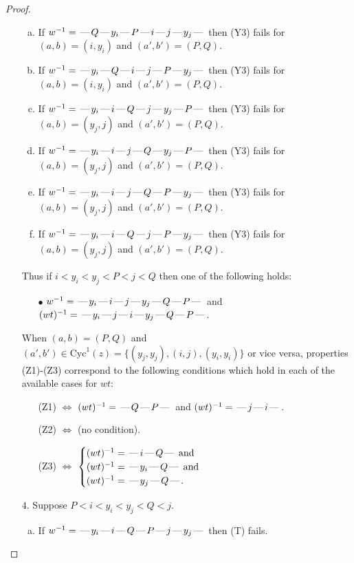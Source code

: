 \documentclass[10pt]{article}
\theoremstyle{definition}
\theoremstyle{definition}
\def\dash{\text{\hspace{0.5mm}---\hspace{0.5mm}}}
\def\Cyc{\mathrm{Cyc}}
\begin{document}
\begin{proof}
\begin{enumerate}
\begin{enumerate}[(a)]
\item If $w^{-1} = \dash Q\dash y_i\dash P\dash i\dash j\dash y_j\dash $ then (Y3) fails for $(a,b)=(i,y_i)$ and $(a',b')=(P,Q)$.
\item If $w^{-1} = \dash y_i\dash Q\dash i\dash j\dash P\dash y_j\dash $ then (Y3) fails for $(a,b)=(i,y_i)$ and $(a',b')=(P,Q)$.
\item If $w^{-1} = \dash y_i\dash i\dash Q\dash j\dash y_j\dash P\dash $ then (Y3) fails for $(a,b)=(y_j,j)$ and $(a',b')=(P,Q)$.
\item If $w^{-1} = \dash y_i\dash i\dash j\dash Q\dash y_j\dash P\dash $ then (Y3) fails for $(a,b)=(y_j,j)$ and $(a',b')=(P,Q)$.
\item If $w^{-1} = \dash y_i\dash i\dash j\dash Q\dash P\dash y_j\dash $ then (Y3) fails for $(a,b)=(y_j,j)$ and $(a',b')=(P,Q)$.
\item If $w^{-1} = \dash y_i\dash i\dash Q\dash j\dash P\dash y_j\dash $ then (Y3) fails for $(a,b)=(y_j,j)$ and $(a',b')=(P,Q)$.
\end{enumerate}
Thus if $i < y_i < y_j < P < j < Q$ then one of the following holds:
\begin{enumerate}
\item[$\bullet$] $w^{-1} = \dash y_i\dash i\dash j\dash y_j\dash Q\dash P\dash $ and $(wt)^{-1} = \dash y_i\dash j\dash i\dash y_j\dash Q\dash P\dash $.
\end{enumerate}
When $(a,b)= (P,Q)$ and $(a',b')\in \Cyc^1(z)=\{(y_j,y_j),(i,j),(y_i,y_i)\}$ or vice versa,
properties (Z1)-(Z3) correspond to the following conditions which
hold in each of the available cases for $wt$:
\begin{enumerate}
\item[](Z1) $\Leftrightarrow$ $(wt)^{-1} = \dash Q \dash P \dash$  and $(wt)^{-1} = \dash j \dash i \dash$.
\item[](Z2) $\Leftrightarrow$ (no condition).
\item[](Z3) $\Leftrightarrow$ $\begin{cases}\text{$(wt)^{-1} = \dash i \dash Q \dash$}\text{ and }\\
\text{$(wt)^{-1} = \dash y_i \dash Q \dash$}\text{ and }\\
\text{$(wt)^{-1} = \dash y_j \dash Q \dash$}.\end{cases}$
\end{enumerate}
\item[$4$.] Suppose $P < i < y_i < y_j < Q < j$.
\begin{enumerate}[(a)]
\item If $w^{-1} = \dash y_i\dash i\dash Q\dash P\dash j\dash y_j\dash $ then (T) fails.

\end{enumerate}
\end{enumerate}
\end{proof}
\end{document}
